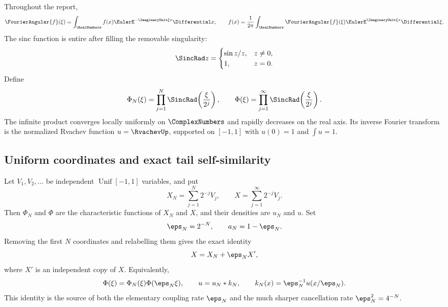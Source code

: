 \documentclass[11pt,oneside]{article}
\numberwithin{equation}{section}
\theoremstyle{definition}
\theoremstyle{remark}
\begin{document}
Throughout the report,
\begin{equation}
 \FourierAngular{f}(\xi)=\int_{\RealNumbers}f(x)\EulerE^{-\ImaginaryUnit\xi x}\Differential x,
 \qquad
 f(x)=\frac1{2\pi}\int_{\RealNumbers}\FourierAngular{f}(\xi)\EulerE^{\ImaginaryUnit\xi x}\Differential\xi.
 \label{p5:eq:fourier}
\end{equation}
The sinc function is entire after filling the removable singularity:
\[
 \SincRad z=\begin{cases}\sin z/z,&z\ne0,\\1,&z=0.\end{cases}
\]
Define
\begin{equation}
 \Phi_N(\xi)=\prod_{j=1}^{N}\SincRad\!\left(\frac{\xi}{2^j}\right),
 \qquad
 \Phi(\xi)=\prod_{j=1}^{\infty}\SincRad\!\left(\frac{\xi}{2^j}\right).
 \label{p5:eq:products}
\end{equation}
The infinite product converges locally uniformly on $\ComplexNumbers$ and rapidly decreases on the real axis.  Its inverse Fourier transform is the normalized Rvachev function $u=\RvachevUp$, supported on $[-1,1]$ with $u(0)=1$ and $\int u=1$.

\subsection{Uniform coordinates and exact tail self-similarity}

Let $V_1,V_2,\ldots$ be independent $\operatorname{Unif}[-1,1]$ variables, and put
\begin{equation}
 X_N=\sum_{j=1}^{N}2^{-j}V_j,
 \qquad
 X=\sum_{j=1}^{\infty}2^{-j}V_j.
 \label{p5:eq:random-series}
\end{equation}
Then $\Phi_N$ and $\Phi$ are the characteristic functions of $X_N$ and $X$, and their densities are $u_N$ and $u$.  Set
\begin{equation}
 \eps_N=2^{-N},\qquad a_N=1-\eps_N.
 \label{p5:eq:eps-a}
\end{equation}
Removing the first $N$ coordinates and relabelling them gives the exact identity
\begin{equation}
 X=X_N+\eps_N X',
 \label{p5:eq:tail-coupling}
\end{equation}
where $X'$ is an independent copy of $X$.  Equivalently,
\begin{equation}
 \Phi(\xi)=\Phi_N(\xi)\Phi(\eps_N\xi),
 \qquad
 u=u_N*k_N,
 \qquad
 k_N(x)=\eps_N^{-1}u(x/\eps_N).
 \label{p5:eq:tail-factorization}
\end{equation}
This identity is the source of both the elementary coupling rate $\eps_N$ and the much sharper cancellation rate $\eps_N^2=4^{-N}$.
\end{document}

